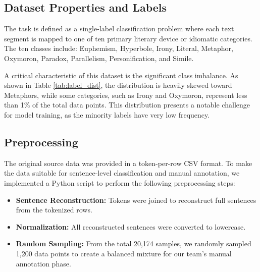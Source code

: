 \documentclass[11pt]{article}
\begin{document}
\subsection{Dataset Properties and Labels}
The task is defined as a single-label classification problem where each text segment is mapped to one of ten primary literary device or idiomatic categories. The ten classes include: Euphemism, Hyperbole, Irony, Literal, Metaphor, Oxymoron, Paradox, Parallelism, Personification, and Simile. 

A critical characteristic of this dataset is the significant class imbalance. As shown in Table \ref{tab:label_dist}, the distribution is heavily skewed toward Metaphors, while some categories, such as Irony and Oxymoron, represent less than 1\% of the total data points. This distribution presents a notable challenge for model training, as the minority labels have very low frequency.

\begin{table}[h]
  \centering
  \caption{Label Distribution in the PIE-English Corpus}
  \label{tab:label_dist}
  \end{table}
\subsection{Preprocessing}
The original source data was provided in a token-per-row CSV format. To make the data suitable for sentence-level classification and manual annotation, we implemented a Python script to perform the following preprocessing steps:
\begin{itemize}
    \item \textbf{Sentence Reconstruction:} Tokens were joined to reconstruct full sentences from the tokenized rows.
    \item \textbf{Normalization:} All reconstructed sentences were converted to lowercase.
    \item \textbf{Random Sampling:} From the total 20,174 samples, we randomly sampled 1,200 data points to create a balanced mixture for our team's manual annotation phase.
\end{itemize}
\end{document}
